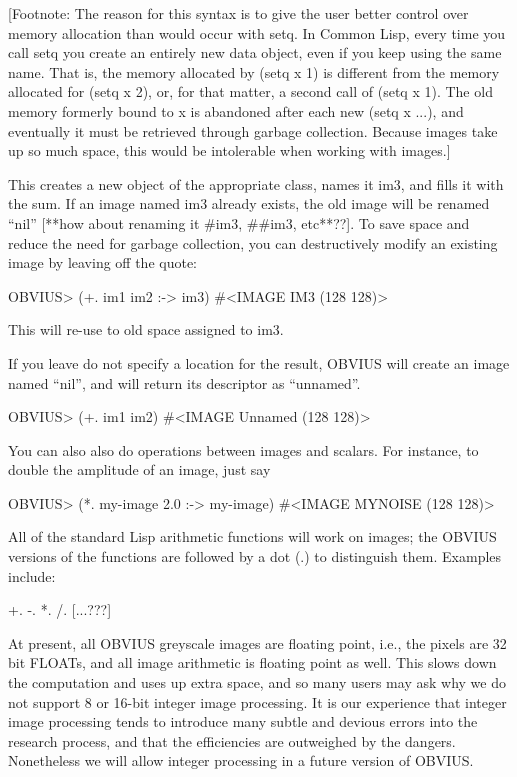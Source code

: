[Footnote: The reason for this syntax is to give the user better
control over memory allocation than would occur with setq.  In Common
Lisp, every time you call setq you create an entirely new data object,
even if you keep using the same name.  That is, the memory allocated
by (setq x 1) is different from the memory allocated for (setq x 2),
or, for that matter, a second call of (setq x 1).  The old memory
formerly bound to x is abandoned after each new (setq x ...), and
eventually it must be retrieved through garbage collection.  Because
images take up so much space, this would be intolerable when working
with images.]

This creates a new object of the appropriate class, names it im3, and
fills it with the sum.
If an image named im3 already exists, the old image will be renamed ``nil''
[**how about renaming it #im3, ##im3, etc**??].
To save space and reduce the need for garbage collection, you can
destructively modify an existing image by leaving off the quote:

OBVIUS> (+. im1 im2 :-> im3)
#<IMAGE IM3 (128 128)>

This will re-use to old space assigned to im3.

If you leave do not specify a location for the result, OBVIUS will create
an image named ``nil'', and will return its descriptor as ``unnamed''.

OBVIUS> (+. im1 im2)
#<IMAGE Unnamed (128 128)>

You can also also do operations between images and scalars.  For
instance, to double the amplitude of an image, just say

OBVIUS> (*. my-image 2.0 :-> my-image)
#<IMAGE MYNOISE (128 128)>

All of the standard Lisp arithmetic functions will work on images;
the OBVIUS versions of the functions are followed by a dot (.) to
distinguish them.  Examples include: 

+.	-.	*.	/. [...???]

At present, all OBVIUS greyscale images are floating point, i.e., the
pixels are 32 bit FLOATs, and all image arithmetic is floating point
as well.  This slows down the computation and uses up extra space,
and so many users may ask why we do not support  8 or 16-bit integer
image processing.  It is our experience that integer image
processing tends to introduce many subtle and devious errors
into the research process, and that the efficiencies are outweighed by
the dangers.  Nonetheless we will allow integer processing in
a future version of OBVIUS.

